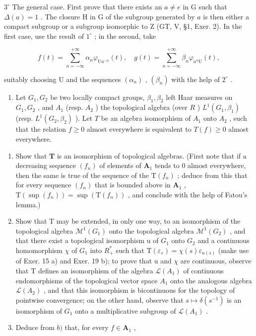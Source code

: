 \(3^{\circ}\) The general case. First prove that there exists an \(a \neq e\) in G such that \(\Delta(a) = 1\) . The closure H in G of the subgroup generated by \(a\) is then either a compact subgroup or a subgroup isomorphic to Z (GT, V, §1, Exer. 2). In the first case, use the result of \(1^{\circ}\) ; in the second, take

\[
f (t) = \sum_ {n = - \infty} ^ {+ \infty} \alpha_ {n} \varphi_ {\mathrm{U} a ^ {- n}} (t), \quad g (t) = \sum_ {n = - \infty} ^ {+ \infty} \beta_ {n} \varphi_ {a ^ {n} \mathrm{U}} (t),
\]

suitably choosing U and the sequences \((\alpha_{n})\) , \((\beta_{n})\) with the help of \(2^{\circ}\) .

\begin{enumerate}
\def\labelenumi{\arabic{enumi})}
\setcounter{enumi}{27}
\tightlist
\item
  Let \(G_1, G_2\) be two locally compact groups, \(\beta_1, \beta_2\) left Haar measures on \(G_1, G_2\) , and \(A_1\) (resp. \(A_2\) ) the topological algebra (over \(R\) ) \(L^1(G_1, \beta_1)\) (resp. \(L^1(G_2, \beta_2)\) ). Let \(T\) be an algebra isomorphism of \(A_1\) onto \(A_2\) , such that the relation \(f \geqslant 0\) almost everywhere is equivalent to \(T(f) \geqslant 0\) almost everywhere.
\end{enumerate}

\begin{enumerate}
\def\labelenumi{\alph{enumi})}
\item
  Show that \(\mathbf{T}\) is an isomorphism of topological algebras. (First note that if a decreasing sequence \((f_n)\) of elements of \(\mathbf{A}_1\) tends to 0 almost everywhere, then the same is true of the sequence of the \(\mathrm{T}(f_n)\) ; deduce from this that for every sequence \((f_n)\) that is bounded above in \(\mathbf{A}_1\) , \(\mathrm{T}(\sup (f_n)) = \sup (\mathrm{T}(f_n))\) , and conclude with the help of Fatou's lemma.)
\item
  Show that T may be extended, in only one way, to an isomorphism of the topological algebra \(\mathcal{M}^{1}(G_{1})\) onto the topological algebra \(\mathcal{M}^{1}(G_{2})\) , and that there exist a topological isomorphism u of \(G_{1}\) onto \(G_{2}\) and a continuous homomorphism \(\chi\) of \(G_{1}\) into \(R_{+}^{*}\) such that \(\mathrm{T}(\varepsilon_{s}) = \chi(s)\varepsilon_{u(s)}\) (make use of Exer. 15 a) and Exer. 19 b); to prove that u and \(\chi\) are continuous, observe that T defines an isomorphism of the algebra \(\mathcal{L}(A_{1})\) of continuous endomorphisms of the topological vector space \(A_{1}\) onto the analogous algebra \(\mathcal{L}(A_{2})\) , and that this isomorphism is bicontinuous for the topology of pointwise convergence; on the other hand, observe that \(s \mapsto \delta(s^{-1})\) is an isomorphism of \(G_{1}\) onto a multiplicative subgroup of \(\mathcal{L}(A_{1})\) .
\item
  Deduce from \(b)\) that, for every \(f \in \mathbf{A}_1\) ,
\end{enumerate}

